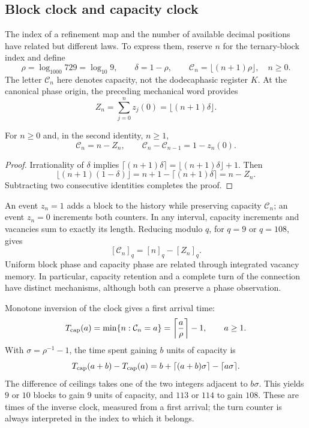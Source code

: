 \subsection{Block clock and capacity clock}
\label{x_reciprocidad:mono-ampl:relojes}

The index of a refinement map and the number of available decimal
positions have related but different laws. To
express them, reserve \(n\) for the ternary-block index and define
\[
 \rho=\log_{1000}729=\log_{10}9,\qquad
 \delta=1-\rho,\qquad
 \mathcal C_n=\lfloor(n+1)\rho\rfloor,\quad n\geq0.
\]
The letter \(\mathcal C_n\) here denotes capacity, not the dodecaphasic
register \(K\). At the canonical phase origin, the preceding mechanical word
provides
\[
 Z_n=\sum_{j=0}^{n}z_j(0)=\lfloor(n+1)\delta\rfloor.
\]

\begin{proposition}
\label{x_reciprocidad:mono-ampl:balance-capacidad}
For \(n\geq0\) and, in the second identity, \(n\geq1\),
\[
 \mathcal C_n=n-Z_n,\qquad
 \mathcal C_n-\mathcal C_{n-1}=1-z_n(0).
\]
\end{proposition}
\begin{proof}
Irrationality of \(\delta\) implies
\(\lceil(n+1)\delta\rceil=\lfloor(n+1)\delta\rfloor+1\).
Then
\[
 \lfloor(n+1)(1-\delta)\rfloor
 =n+1-\lceil(n+1)\delta\rceil=n-Z_n.
\]
Subtracting two consecutive identities completes the proof.
\end{proof}

An event \(z_n=1\) adds a block to the history while preserving capacity
\(\mathcal C_n\); an event \(z_n=0\) increments both counters. In
any interval, capacity increments and vacancies sum to
exactly its length. Reducing modulo \(q\), for \(q=9\) or
\(q=108\), gives
\[
 [\mathcal C_n]_q=[n]_q-[Z_n]_q.
\]
Uniform block phase and capacity phase are related through
integrated vacancy memory. In particular, capacity
retention and a complete turn of the connection have distinct
mechanisms, although both can preserve a phase observation.

Monotone inversion of the clock gives a first arrival time:
\[
 T_{\rm cap}(a)=\min\{n:\mathcal C_n=a\}
 =\left\lceil\frac a\rho\right\rceil-1,
 \qquad a\geq1.
\]
With \(\sigma=\rho^{-1}-1\), the time spent gaining \(b\) units
of capacity is
\[
 T_{\rm cap}(a+b)-T_{\rm cap}(a)
 =b+\lceil(a+b)\sigma\rceil-\lceil a\sigma\rceil.
\]
The difference of ceilings takes one of the two integers adjacent to
\(b\sigma\). This yields \(9\) or \(10\) blocks to gain
\(9\) units of capacity, and \(113\) or \(114\) to gain \(108\).
These are times of the inverse clock, measured from a first arrival; the
turn counter is always interpreted in the index to which it belongs.

